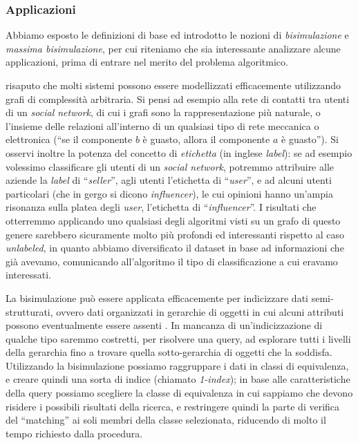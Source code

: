 \subsubsection{Applicazioni}
\label{sec:applications}
Abbiamo esposto le definizioni di base ed introdotto le nozioni di \emph{bisimulazione} e \emph{massima bisimulazione}, per cui riteniamo che sia interessante analizzare alcune applicazioni, prima di entrare nel merito del problema algoritmico.

\accente risaputo che molti sistemi possono essere modellizzati efficacemente utilizzando grafi di complessità arbitraria. Si pensi ad esempio alla rete di contatti tra utenti di un \emph{social network}, di cui i grafi sono la rappresentazione più naturale, o l'insieme delle relazioni all'interno di un qualsiasi tipo di rete meccanica o elettronica (``se il componente $b$ è guasto, allora il componente $a$ è guasto''). Si osservi inoltre la potenza del concetto di \emph{etichetta} (in inglese \emph{label}): se ad esempio volessimo classificare gli utenti di un \emph{social network}, potremmo attribuire alle aziende la \emph{label} di ``\emph{seller}'', agli utenti l'etichetta di ``\emph{user}'', e ad alcuni utenti particolari (che in gergo si dicono \emph{influencer}), le cui opinioni hanno un'ampia risonanza sulla platea degli \emph{user}, l'etichetta di ``\emph{influencer}''. I risultati che otterremmo applicando uno qualsiasi degli algoritmi visti su un grafo di questo genere sarebbero sicuramente molto più profondi ed interessanti rispetto al caso \emph{unlabeled}, in quanto abbiamo diversificato il dataset in base ad informazioni che già avevamo, comunicando all'algoritmo il tipo di classificazione a cui eravamo interessati.

La bisimulazione può essere applicata efficacemente per indicizzare dati semi-strutturati, ovvero dati organizzati in gerarchie di oggetti in cui alcuni attributi possono eventualmente essere assenti \cite{milo}. In mancanza di un'indicizzazione di qualche tipo saremmo costretti, per risolvere una query, ad esplorare tutti i livelli della gerarchia fino a trovare quella sotto-gerarchia di oggetti che la soddisfa. Utilizzando la bisimulazione possiamo raggruppare i dati in classi di equivalenza, e creare quindi una sorta di indice (chiamato \emph{1-index}); in base alle caratteristiche della query possiamo scegliere la classe di equivalenza in cui sappiamo che devono risidere i possibili risultati della ricerca, e restringere quindi la parte di verifica del ``matching'' ai soli membri della classe selezionata, riducendo di molto il tempo richiesto dalla procedura.

